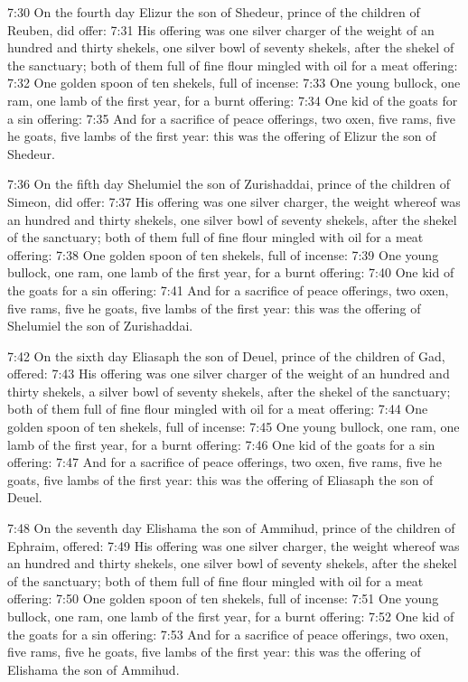 7:30 On the fourth day Elizur the son of Shedeur, prince of the
children of Reuben, did offer: 7:31 His offering was one silver
charger of the weight of an hundred and thirty shekels, one silver
bowl of seventy shekels, after the shekel of the sanctuary; both of
them full of fine flour mingled with oil for a meat offering: 7:32 One
golden spoon of ten shekels, full of incense: 7:33 One young bullock,
one ram, one lamb of the first year, for a burnt offering: 7:34 One
kid of the goats for a sin offering: 7:35 And for a sacrifice of peace
offerings, two oxen, five rams, five he goats, five lambs of the first
year: this was the offering of Elizur the son of Shedeur.

7:36 On the fifth day Shelumiel the son of Zurishaddai, prince of the
children of Simeon, did offer: 7:37 His offering was one silver
charger, the weight whereof was an hundred and thirty shekels, one
silver bowl of seventy shekels, after the shekel of the sanctuary;
both of them full of fine flour mingled with oil for a meat offering:
7:38 One golden spoon of ten shekels, full of incense: 7:39 One young
bullock, one ram, one lamb of the first year, for a burnt offering:
7:40 One kid of the goats for a sin offering: 7:41 And for a sacrifice
of peace offerings, two oxen, five rams, five he goats, five lambs of
the first year: this was the offering of Shelumiel the son of
Zurishaddai.

7:42 On the sixth day Eliasaph the son of Deuel, prince of the
children of Gad, offered: 7:43 His offering was one silver charger of
the weight of an hundred and thirty shekels, a silver bowl of seventy
shekels, after the shekel of the sanctuary; both of them full of fine
flour mingled with oil for a meat offering: 7:44 One golden spoon of
ten shekels, full of incense: 7:45 One young bullock, one ram, one
lamb of the first year, for a burnt offering: 7:46 One kid of the
goats for a sin offering: 7:47 And for a sacrifice of peace offerings,
two oxen, five rams, five he goats, five lambs of the first year: this
was the offering of Eliasaph the son of Deuel.

7:48 On the seventh day Elishama the son of Ammihud, prince of the
children of Ephraim, offered: 7:49 His offering was one silver
charger, the weight whereof was an hundred and thirty shekels, one
silver bowl of seventy shekels, after the shekel of the sanctuary;
both of them full of fine flour mingled with oil for a meat offering:
7:50 One golden spoon of ten shekels, full of incense: 7:51 One young
bullock, one ram, one lamb of the first year, for a burnt offering:
7:52 One kid of the goats for a sin offering: 7:53 And for a sacrifice
of peace offerings, two oxen, five rams, five he goats, five lambs of
the first year: this was the offering of Elishama the son of Ammihud.


